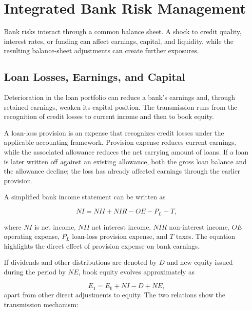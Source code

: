 \section{Integrated Bank Risk Management}

Bank risks interact through a common balance sheet. A shock to credit quality, interest rates, or funding can affect earnings, capital, and liquidity, while the resulting balance-sheet adjustments can create further exposures.

\subsection{Loan Losses, Earnings, and Capital}

Deterioration in the loan portfolio can reduce a bank's earnings and, through retained earnings, weaken its capital position. The transmission runs from the recognition of credit losses to current income and then to book equity.

A loan-loss provision is an expense that recognizes credit losses under the applicable accounting framework. Provision expense reduces current earnings, while the associated allowance reduces the net carrying amount of loans. If a loan is later written off against an existing allowance, both the gross loan balance and the allowance decline; the loss has already affected earnings through the earlier provision.

A simplified bank income statement can be written as

\begin{equation}
\textit{NI}=\textit{NII}+\textit{NIR}-\textit{OE}-P_L-T,
\label{eq:ch12-bank-net-income}
\end{equation}

where $\textit{NI}$ is net income, $\textit{NII}$ net interest income, $\textit{NIR}$ non-interest income, $\textit{OE}$ operating expense, $P_L$ loan-loss provision expense, and $T$ taxes. The equation highlights the direct effect of provision expense on bank earnings.

If dividends and other distributions are denoted by $D$ and new equity issued during the period by $\textit{NE}$, book equity evolves approximately as

\begin{equation}
E_1=E_0+\textit{NI}-D+\textit{NE},
\label{eq:ch12-equity-evolution}
\end{equation}
apart from other direct adjustments to equity. The two relations show the transmission mechanism:

